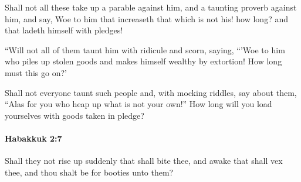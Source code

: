 			\begin{versebox}
					\item[BHS] 
					\item[LXX] 
					\item[ASV] Shall not all these take up a parable against him, and a taunting proverb against him, and say, Woe to him that increaseth that which is not his! how long? and that ladeth himself with pledges!
					\item[NIV] “Will not all of them taunt him with ridicule and scorn, saying, “’Woe to him who piles up stolen goods and makes himself wealthy by extortion! How long must this go on?’
					\item[NRSV] Shall not everyone taunt such people and, with mocking riddles, say about them, “Alas for you who heap up what is not your own!” How long will you load yourselves with goods taken in pledge?
			\end{versebox}

		\paragraph{Habakkuk 2:7} %
			\label{HABAKKUK-2-7}

			Shall they not rise up suddenly that shall bite thee, and awake that shall vex thee, and thou shalt be for booties unto them?

